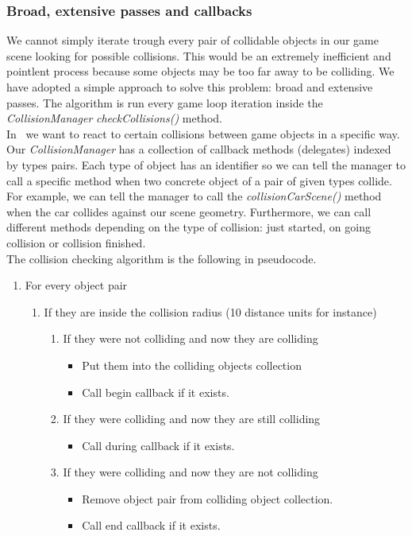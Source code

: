 

\subsubsection{Broad, extensive passes and callbacks}

We cannot simply iterate trough every pair of collidable objects in our game scene looking
for possible collisions. This would be an extremely inefficient and pointlent process because
some objects may be too far away to be colliding. We have adopted a simple approach to solve
this problem: broad and extensive passes. The algorithm is run every game loop iteration
inside the \textit{CollisionManager} \textit{checkCollisions()} method.\\

In \game\, we want to react to certain collisions between game objects in a specific way.
Our \textit{CollisionManager} has a collection of callback methods (delegates) indexed
by types pairs. Each type of object has an identifier so we can tell the manager to call
a specific method when two concrete object of a pair of given types collide.
For example, we can tell the manager
to call the \textit{collisionCarScene()} method when the car collides against our scene geometry.
Furthermore, we can call different methods depending on the type of collision: just started,
on going collision or collision finished.\\

The collision checking algorithm is the following in pseudocode.

\begin{enumerate}
	\item For every object pair
	\begin{enumerate}
		\item If they are inside the collision radius (10 distance units for instance)
			\begin{enumerate}
				\item If they were not colliding and now they are colliding
				\begin{itemize}
					\item Put them into the colliding objects collection
					\item Call begin callback if it exists.
				\end{itemize}
				\item If they were colliding and now they are still colliding
				\begin{itemize}
					\item Call during callback if it exists.
				\end{itemize}
				\item If they were colliding and now they are not colliding
				\begin{itemize}
					\item Remove object pair from colliding object collection.
					\item Call end callback if it exists.
				\end{itemize}
			\end{enumerate}
	\end{enumerate}
\end{enumerate}

